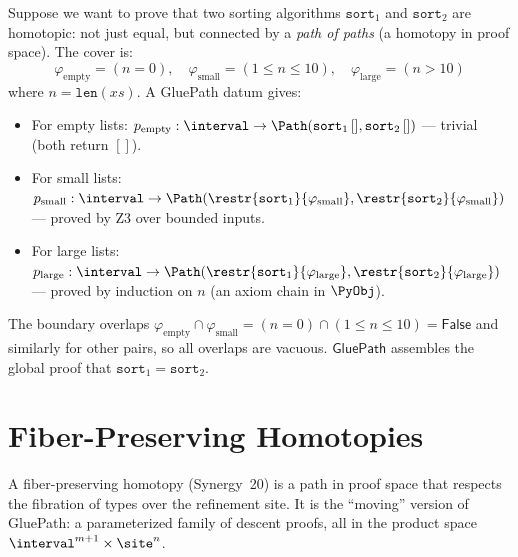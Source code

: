 \begin{example}
Suppose we want to prove that two sorting algorithms $\mathtt{sort}_1$
and $\mathtt{sort}_2$ are homotopic: not just equal, but connected by a
\emph{path of paths} (a homotopy in proof space).  The cover is:
\[
  \varphi_{\mathrm{empty}} = (n = 0), \quad
  \varphi_{\mathrm{small}} = (1 \leq n \leq 10), \quad
  \varphi_{\mathrm{large}} = (n > 10)
\]
where $n = \mathtt{len}(xs)$.  A GluePath datum gives:
\begin{itemize}
\item For empty lists: $p_{\mathrm{empty}} : \interval \to \Path(\mathtt{sort}_1\,[], \mathtt{sort}_2\,[])$
  --- trivial (both return $[]$).
\item For small lists: $p_{\mathrm{small}} : \interval \to \Path(\restr{\mathtt{sort}_1}{\varphi_{\mathrm{small}}}, \restr{\mathtt{sort}_2}{\varphi_{\mathrm{small}}})$
  --- proved by Z3 over bounded inputs.
\item For large lists: $p_{\mathrm{large}} : \interval \to \Path(\restr{\mathtt{sort}_1}{\varphi_{\mathrm{large}}}, \restr{\mathtt{sort}_2}{\varphi_{\mathrm{large}}})$
  --- proved by induction on $n$ (an axiom chain in $\PyObj$).
\end{itemize}
The boundary overlaps $\varphi_{\mathrm{empty}} \cap \varphi_{\mathrm{small}}
= (n = 0) \cap (1 \leq n \leq 10) = \mathsf{False}$ and similarly for other
pairs, so all overlaps are vacuous.  $\mathsf{GluePath}$ assembles the global
proof that $\mathtt{sort}_1 = \mathtt{sort}_2$.
\end{example}


\section{Fiber-Preserving Homotopies}
\label{sec:fiber-homotopies}

A fiber-preserving homotopy (Synergy~20) is a path in proof space that
respects the fibration of types over the refinement site.  It is the
``moving'' version of GluePath: a parameterized family of descent proofs,
all in the product space $\interval^{m+1} \times \site^n$.

